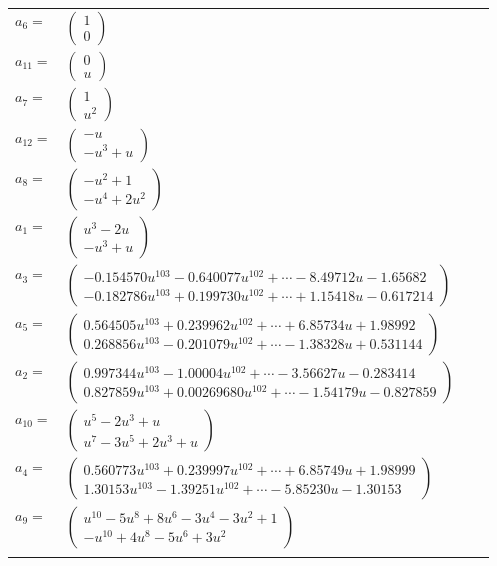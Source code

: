 \documentclass[1p]{elsarticle_modified}
\theoremstyle{definition}
\begin{document}
\begin{tabular}{m{7pt} m{180pt} m{7pt} m{180pt} }
\flushright $a_{6}=$&$\begin{pmatrix}1\\0\end{pmatrix}$ \\
\flushright $a_{11}=$&$\begin{pmatrix}0\\u\end{pmatrix}$ \\
\flushright $a_{7}=$&$\begin{pmatrix}1\\u^2\end{pmatrix}$ \\
\flushright $a_{12}=$&$\begin{pmatrix}- u\\- u^3+u\end{pmatrix}$ \\
\flushright $a_{8}=$&$\begin{pmatrix}- u^2+1\\- u^4+2 u^2\end{pmatrix}$ \\
\flushright $a_{1}=$&$\begin{pmatrix}u^3-2 u\\- u^3+u\end{pmatrix}$ \\
\flushright $a_{3}=$&$\begin{pmatrix}-0.154570 u^{103}-0.640077 u^{102}+\cdots-8.49712 u-1.65682\\-0.182786 u^{103}+0.199730 u^{102}+\cdots+1.15418 u-0.617214\end{pmatrix}$ \\
\flushright $a_{5}=$&$\begin{pmatrix}0.564505 u^{103}+0.239962 u^{102}+\cdots+6.85734 u+1.98992\\0.268856 u^{103}-0.201079 u^{102}+\cdots-1.38328 u+0.531144\end{pmatrix}$ \\
\flushright $a_{2}=$&$\begin{pmatrix}0.997344 u^{103}-1.00004 u^{102}+\cdots-3.56627 u-0.283414\\0.827859 u^{103}+0.00269680 u^{102}+\cdots-1.54179 u-0.827859\end{pmatrix}$ \\
\flushright $a_{10}=$&$\begin{pmatrix}u^5-2 u^3+u\\u^7-3 u^5+2 u^3+u\end{pmatrix}$ \\
\flushright $a_{4}=$&$\begin{pmatrix}0.560773 u^{103}+0.239997 u^{102}+\cdots+6.85749 u+1.98999\\1.30153 u^{103}-1.39251 u^{102}+\cdots-5.85230 u-1.30153\end{pmatrix}$ \\
\flushright $a_{9}=$&$\begin{pmatrix}u^{10}-5 u^8+8 u^6-3 u^4-3 u^2+1\\- u^{10}+4 u^8-5 u^6+3 u^2\end{pmatrix}$\\&\end{tabular}
\end{document}
